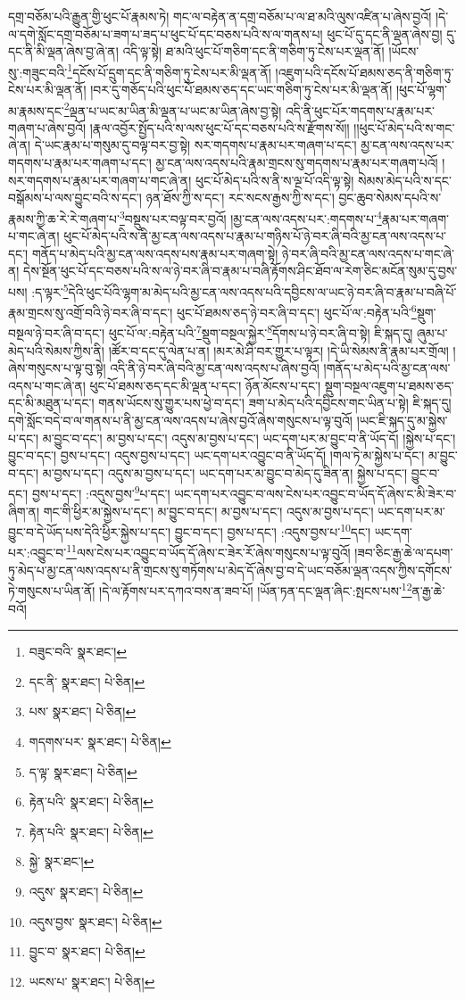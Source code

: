 དགྲ་བཅོམ་པའི་རྒྱུན་གྱི་ཕུང་པོ་རྣམས་ཏེ། གང་ལ་བརྟེན་ན་དགྲ་བཅོམ་པ་ལ་ཐ་མའི་ལུས་འཛིན་པ་ཞེས་བྱའོ། །དེ་ལ་དགེ་སློང་དགྲ་བཅོམ་པ་ཟག་པ་ཟད་པ་ཕུང་པོ་དང་བཅས་པའི་ས་ལ་གནས་པ། ཕུང་པོ་དུ་དང་ནི་ལྡན་ཞེས་བྱ། དུ་དང་ནི་མི་ལྡན་ཞེས་བྱ་ཞེ་ན། འདི་ལྟ་སྟེ། ཐ་མའི་ཕུང་པོ་གཅིག་དང་ནི་གཅིག་ཏུ་ངེས་པར་ལྡན་ནོ། །ཡོངས་སུ་:གཟུང་བའི་\footnote{བཟུང་བའི་  སྣར་ཐང་། }དངོས་པོ་དྲུག་དང་ནི་གཅིག་ཏུ་ངེས་པར་མི་ལྡན་ནོ། །འཇུག་པའི་དངོས་པོ་ཐམས་ཅད་ནི་གཅིག་ཏུ་ངེས་པར་མི་ལྡན་ནོ། །བར་དུ་གཅོད་པའི་ཕུང་པོ་ཐམས་ཅད་དང་ཡང་གཅིག་ཏུ་ངེས་པར་མི་ལྡན་ནོ། །ཕུང་པོ་ལྷག་མ་རྣམས་དང་\footnote{དང་ནི་  སྣར་ཐང་།  པེ་ཅིན། }ལྡན་པ་ཡང་མ་ཡིན་མི་ལྡན་པ་ཡང་མ་ཡིན་ཞེས་བྱ་སྟེ། འདི་ནི་ཕུང་པོར་གདགས་པ་རྣམ་པར་གཞག་པ་ཞེས་བྱའོ། །རྣལ་འབྱོར་སྤྱོད་པའི་ས་ལས་ཕུང་པོ་དང་བཅས་པའི་ས་རྫོགས་སོ།། །།ཕུང་པོ་མེད་པའི་ས་གང་ཞེ་ན། དེ་ཡང་རྣམ་པ་གསུམ་དུ་བལྟ་བར་བྱ་སྟེ། སར་གདགས་པ་རྣམ་པར་གཞག་པ་དང་། མྱ་ངན་ལས་འདས་པར་གདགས་པ་རྣམ་པར་གཞག་པ་དང་། མྱ་ངན་ལས་འདས་པའི་རྣམ་གྲངས་སུ་གདགས་པ་རྣམ་པར་གཞག་པའོ། །སར་གདགས་པ་རྣམ་པར་གཞག་པ་གང་ཞེ་ན། ཕུང་པོ་མེད་པའི་ས་ནི་ས་ལྔ་པོ་འདི་ལྟ་སྟེ། སེམས་མེད་པའི་ས་དང་བསྒོམས་པ་ལས་བྱུང་བའི་ས་དང་། ཉན་ཐོས་ཀྱི་ས་དང་། རང་སངས་རྒྱས་ཀྱི་ས་དང་། བྱང་ཆུབ་སེམས་དཔའི་ས་རྣམས་ཀྱི་ཆ་རེ་རེ་གཞག་པ་\footnote{པས་  སྣར་ཐང་།  པེ་ཅིན། }བསྡུས་པར་བལྟ་བར་བྱའོ། །མྱ་ངན་ལས་འདས་པར་:གདགས་པ་\footnote{གདགས་པར་  སྣར་ཐང་།  པེ་ཅིན། }རྣམ་པར་གཞག་པ་གང་ཞེ་ན། ཕུང་པོ་མེད་པའི་ས་ནི་མྱ་ངན་ལས་འདས་པ་རྣམ་པ་གཉིས་པོ་ཉེ་བར་ཞི་བའི་མྱ་ངན་ལས་འདས་པ་དང་། གནོད་པ་མེད་པའི་མྱ་ངན་ལས་འདས་པས་རྣམ་པར་གཞག་སྟེ། ཉེ་བར་ཞི་བའི་མྱ་ངན་ལས་འདས་པ་གང་ཞེ་ན། དེས་སྔོན་ཕུང་པོ་དང་བཅས་པའི་ས་ལ་ཉེ་བར་ཞི་བ་རྣམ་པ་བཞི་རྟོགས་ཤིང་ཐོབ་ལ་རེག་ཅིང་མངོན་སུམ་དུ་བྱས་པས། :ད་ལྟར་\footnote{ད་ལྟ་  སྣར་ཐང་།  པེ་ཅིན། }དེའི་ཕུང་པོའི་ལྷག་མ་མེད་པའི་མྱ་ངན་ལས་འདས་པའི་དབྱིངས་ལ་ཡང་ཉེ་བར་ཞི་བ་རྣམ་པ་བཞི་པོ་རྣམ་གྲངས་སུ་འགྲོ་བའི་ཉེ་བར་ཞི་བ་དང་། ཕུང་པོ་ཐམས་ཅད་ཉེ་བར་ཞི་བ་དང་། ཕུང་པོ་ལ་:བརྟེན་པའི་\footnote{རྟེན་པའི་  སྣར་ཐང་།  པེ་ཅིན། }སྡུག་བསྔལ་ཉེ་བར་ཞི་བ་དང་། ཕུང་པོ་ལ་:བརྟེན་པའི་\footnote{རྟེན་པའི་  སྣར་ཐང་།  པེ་ཅིན། }སྡུག་བསྔལ་སྐྱེར་\footnote{སྐྱེ་  སྣར་ཐང་། }དོགས་པ་ཉེ་བར་ཞི་བ་སྟེ། ཇི་སྐད་དུ། ཞུམ་པ་མེད་པའི་སེམས་ཀྱིས་ནི། །ཚོར་བ་དང་དུ་ལེན་པ་ན། །མར་མེ་ཤི་བར་གྱུར་པ་ལྟར། །དེ་ཡི་སེམས་ནི་རྣམ་པར་གྲོལ། །ཞེས་གསུངས་པ་ལྟ་བུ་སྟེ། འདི་ནི་ཉེ་བར་ཞི་བའི་མྱ་ངན་ལས་འདས་པ་ཞེས་བྱའོ། །གནོད་པ་མེད་པའི་མྱ་ངན་ལས་འདས་པ་གང་ཞེ་ན། ཕུང་པོ་ཐམས་ཅད་དང་མི་ལྡན་པ་དང་། ཉོན་མོངས་པ་དང་། སྡུག་བསྔལ་འཇུག་པ་ཐམས་ཅད་དང་མི་མཐུན་པ་དང་། གནས་ཡོངས་སུ་གྱུར་པས་ཕྱེ་བ་དང་། ཟག་པ་མེད་པའི་དབྱིངས་གང་ཡིན་པ་སྟེ། ཇི་སྐད་དུ། དགེ་སློང་བདེ་བ་ལ་གནས་པ་ནི་མྱ་ངན་ལས་འདས་པ་ཞེས་བྱའོ་ཞེས་གསུངས་པ་ལྟ་བུའོ། །ཡང་ཇི་སྐད་དུ་མ་སྐྱེས་པ་དང་། མ་བྱུང་བ་དང་། མ་བྱས་པ་དང་། འདུས་མ་བྱས་པ་དང་། ཡང་དག་པར་མ་བྱུང་བ་ནི་ཡོད་དོ། །སྐྱེས་པ་དང་། བྱུང་བ་དང་། བྱས་པ་དང་། འདུས་བྱས་པ་དང་། ཡང་དག་པར་འབྱུང་བ་ནི་ཡོད་དོ། །གལ་ཏེ་མ་སྐྱེས་པ་དང་། མ་བྱུང་བ་དང་། མ་བྱས་པ་དང་། འདུས་མ་བྱས་པ་དང་། ཡང་དག་པར་མ་བྱུང་བ་མེད་དུ་ཟིན་ན། སྐྱེས་པ་དང་། བྱུང་བ་དང་། བྱས་པ་དང་། :འདུས་བྱས་\footnote{འདུས་  སྣར་ཐང་།  པེ་ཅིན། }པ་དང་། ཡང་དག་པར་འབྱུང་བ་ལས་ངེས་པར་འབྱུང་བ་ཡོད་དོ་ཞེས་ང་མི་ཟེར་བ་ཞིག་ན། གང་གི་ཕྱིར་མ་སྐྱེས་པ་དང་། མ་བྱུང་བ་དང་། མ་བྱས་པ་དང་། འདུས་མ་བྱས་པ་དང་། ཡང་དག་པར་མ་བྱུང་བ་དེ་ཡོད་པས་དེའི་ཕྱིར་སྐྱེས་པ་དང་། བྱུང་བ་དང་། བྱས་པ་དང་། :འདུས་བྱས་པ་\footnote{འདུས་བྱས་  སྣར་ཐང་།  པེ་ཅིན། }དང་། ཡང་དག་པར་:འབྱུང་བ་\footnote{བྱུང་བ་  སྣར་ཐང་།  པེ་ཅིན། }ལས་ངེས་པར་འབྱུང་བ་ཡོད་དོ་ཞེས་ང་ཟེར་རོ་ཞེས་གསུངས་པ་ལྟ་བུའོ། །ཟབ་ཅིང་རྒྱ་ཆེ་ལ་དཔག་ཏུ་མེད་པ་མྱ་ངན་ལས་འདས་པ་ནི་གྲངས་སུ་གཏོགས་པ་མེད་དོ་ཞེས་བྱ་བ་དེ་ཡང་བཅོམ་ལྡན་འདས་ཀྱིས་དགོངས་ཏེ་གསུངས་པ་ཡིན་ནོ། །དེ་ལ་རྟོགས་པར་དཀའ་བས་ན་ཟབ་པོ། །ཡོན་ཏན་དང་ལྡན་ཞིང་:སྤངས་པས་\footnote{ཡངས་པ་  སྣར་ཐང་།  པེ་ཅིན། }ན་རྒྱ་ཆེ་བའོ། 